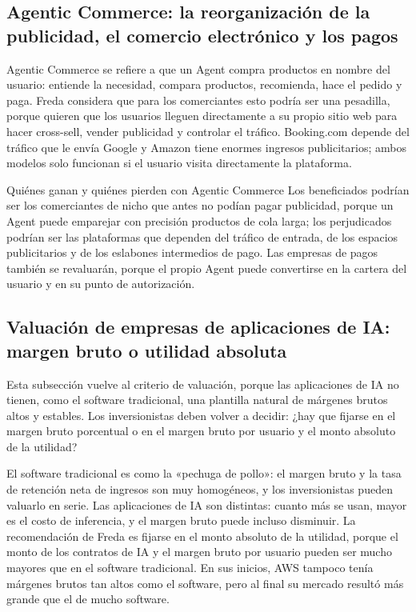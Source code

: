 \documentclass[a4paper]{article}
\begin{document}
\subsection{Agentic Commerce: la reorganización de la publicidad, el comercio electrónico y los pagos}

Agentic Commerce se refiere a que un Agent compra productos en nombre del usuario: entiende la necesidad, compara productos, recomienda, hace el pedido y paga. Freda considera que para los comerciantes esto podría ser una pesadilla, porque quieren que los usuarios lleguen directamente a su propio sitio web para hacer cross-sell, vender publicidad y controlar el tráfico. Booking.com depende del tráfico que le envía Google y Amazon tiene enormes ingresos publicitarios; ambos modelos solo funcionan si el usuario visita directamente la plataforma.

\begin{importantbox}{Quiénes ganan y quiénes pierden con Agentic Commerce}
Los beneficiados podrían ser los comerciantes de nicho que antes no podían pagar publicidad, porque un Agent puede emparejar con precisión productos de cola larga; los perjudicados podrían ser las plataformas que dependen del tráfico de entrada, de los espacios publicitarios y de los eslabones intermedios de pago. Las empresas de pagos también se revaluarán, porque el propio Agent puede convertirse en la cartera del usuario y en su punto de autorización.
\end{importantbox}

\subsection{Valuación de empresas de aplicaciones de IA: margen bruto o utilidad absoluta}

Esta subsección vuelve al criterio de valuación, porque las aplicaciones de IA no tienen, como el software tradicional, una plantilla natural de márgenes brutos altos y estables. Los inversionistas deben volver a decidir: ¿hay que fijarse en el margen bruto porcentual o en el margen bruto por usuario y el monto absoluto de la utilidad?

El software tradicional es como la «pechuga de pollo»: el margen bruto y la tasa de retención neta de ingresos son muy homogéneos, y los inversionistas pueden valuarlo en serie. Las aplicaciones de IA son distintas: cuanto más se usan, mayor es el costo de inferencia, y el margen bruto puede incluso disminuir. La recomendación de Freda es fijarse en el monto absoluto de la utilidad, porque el monto de los contratos de IA y el margen bruto por usuario pueden ser mucho mayores que en el software tradicional. En sus inicios, AWS tampoco tenía márgenes brutos tan altos como el software, pero al final su mercado resultó más grande que el de mucho software.
\end{document}
